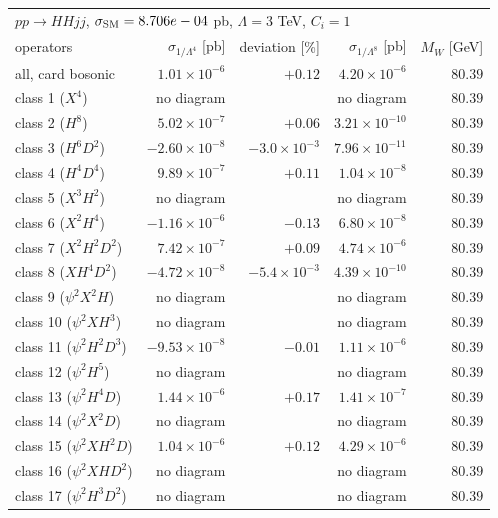 \begin{table}[t]\centering\footnotesize\setlength{\tabcolsep}{4pt}
\begin{tabular}{@{}lrrrr@{}}\hline
\multicolumn{5}{l}{$p p \to H H j j$, $\sigma_{\rm SM} = 8.706e-04$ pb, $\Lambda = 3$ TeV, $C_i = 1$}\\
operators & $\sigma_{1/\Lambda^4}$ [pb] & deviation [\%] & $\sigma_{1/\Lambda^8}$ [pb] & $M_W$ [GeV]\\\hline
all, card bosonic & $1.01\times 10^{-6}$ & $+0.12$ & $4.20\times 10^{-6}$ & $80.39$\\
class 1 ($X^4$) & no diagram &  & no diagram & $80.39$\\
class 2 ($H^8$) & $5.02\times 10^{-7}$ & $+0.06$ & $3.21\times 10^{-10}$ & $80.39$\\
class 3 ($H^6 D^2$) & $-2.60\times 10^{-8}$ & $-3.0\times 10^{-3}$ & $7.96\times 10^{-11}$ & $80.39$\\
class 4 ($H^4 D^4$) & $9.89\times 10^{-7}$ & $+0.11$ & $1.04\times 10^{-8}$ & $80.39$\\
class 5 ($X^3 H^2$) & no diagram &  & no diagram & $80.39$\\
class 6 ($X^2 H^4$) & $-1.16\times 10^{-6}$ & $-0.13$ & $6.80\times 10^{-8}$ & $80.39$\\
class 7 ($X^2 H^2 D^2$) & $7.42\times 10^{-7}$ & $+0.09$ & $4.74\times 10^{-6}$ & $80.39$\\
class 8 ($X H^4 D^2$) & $-4.72\times 10^{-8}$ & $-5.4\times 10^{-3}$ & $4.39\times 10^{-10}$ & $80.39$\\
class 9 ($\psi^2 X^2 H$) & no diagram &  & no diagram & $80.39$\\
class 10 ($\psi^2 X H^3$) & no diagram &  & no diagram & $80.39$\\
class 11 ($\psi^2 H^2 D^3$) & $-9.53\times 10^{-8}$ & $-0.01$ & $1.11\times 10^{-6}$ & $80.39$\\
class 12 ($\psi^2 H^5$) & no diagram &  & no diagram & $80.39$\\
class 13 ($\psi^2 H^4 D$) & $1.44\times 10^{-6}$ & $+0.17$ & $1.41\times 10^{-7}$ & $80.39$\\
class 14 ($\psi^2 X^2 D$) & no diagram &  & no diagram & $80.39$\\
class 15 ($\psi^2 X H^2 D$) & $1.04\times 10^{-6}$ & $+0.12$ & $4.29\times 10^{-6}$ & $80.39$\\
class 16 ($\psi^2 X H D^2$) & no diagram &  & no diagram & $80.39$\\
class 17 ($\psi^2 H^3 D^2$) & no diagram &  & no diagram & $80.39$\\

\end{tabular}
\end{table}
